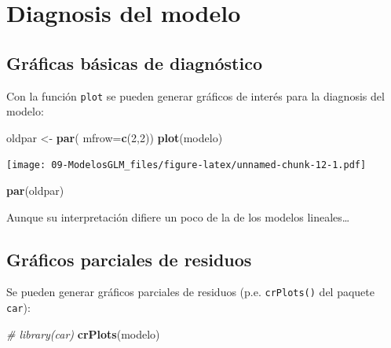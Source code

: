 \documentclass[]{book}
\newenvironment{Shaded}{\begin{snugshade}}{\end{snugshade}}
\newcommand{\CommentTok}[1]{\textcolor[rgb]{0.56,0.35,0.01}{\textit{#1}}}
\newcommand{\DataTypeTok}[1]{\textcolor[rgb]{0.13,0.29,0.53}{#1}}
\newcommand{\DecValTok}[1]{\textcolor[rgb]{0.00,0.00,0.81}{#1}}
\newcommand{\KeywordTok}[1]{\textcolor[rgb]{0.13,0.29,0.53}{\textbf{#1}}}
\newcommand{\NormalTok}[1]{#1}
\newcommand{\StringTok}[1]{\textcolor[rgb]{0.31,0.60,0.02}{#1}}
\begin{document}
\hypertarget{diagnosis-del-modelo-1}{%
\section{Diagnosis del modelo}\label{diagnosis-del-modelo-1}}

\hypertarget{graficas-basicas-de-diagnostico-1}{%
\subsection{Gráficas básicas de diagnóstico}\label{graficas-basicas-de-diagnostico-1}}

Con la función \texttt{plot} se pueden generar gráficos de interés para la diagnosis del modelo:

\begin{Shaded}
\begin{Highlighting}[]
\NormalTok{oldpar <-}\StringTok{ }\KeywordTok{par}\NormalTok{( }\DataTypeTok{mfrow=}\KeywordTok{c}\NormalTok{(}\DecValTok{2}\NormalTok{,}\DecValTok{2}\NormalTok{))}
\KeywordTok{plot}\NormalTok{(modelo)}
\end{Highlighting}
\end{Shaded}

\texttt{[image: 09-ModelosGLM\_files/figure-latex/unnamed-chunk-12-1.pdf]}

\begin{Shaded}
\begin{Highlighting}[]
\KeywordTok{par}\NormalTok{(oldpar)}
\end{Highlighting}
\end{Shaded}

Aunque su interpretación difiere un poco de la de los modelos lineales\ldots{}

\hypertarget{graficos-parciales-de-residuos-1}{%
\subsection{Gráficos parciales de residuos}\label{graficos-parciales-de-residuos-1}}

Se pueden generar gráficos parciales de residuos (p.e. \texttt{crPlots()} del paquete \texttt{car}):

\begin{Shaded}
\begin{Highlighting}[]
\CommentTok{# library(car)}
\KeywordTok{crPlots}\NormalTok{(modelo)}
\end{Highlighting}
\end{Shaded}
\end{document}
